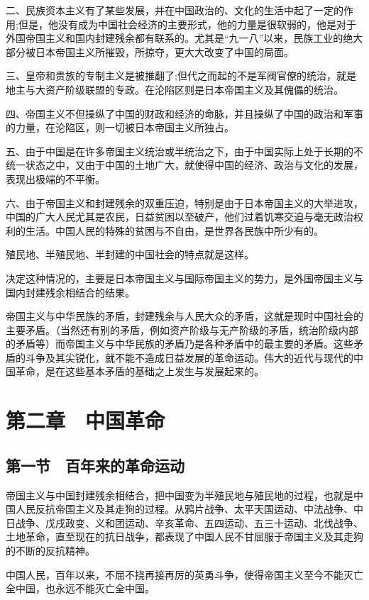二、民族资本主义有了某些发展，并在中国政治的、文化的生活中起了一定的作用;但是，他没有成为中国社会经济的主要形式，他的力量是很软弱的，他是对于外国帝国主义和国内封建残余都有联系的。尤其是“九一八”以来，民族工业的绝大部分被日本帝国主义所摧毁，所掠夺，更大大改变了中国的局面。

三、皇帝和贵族的专制主义是被推翻了;但代之而起的不是军阀官僚的统治，就是地主与大资产阶级联盟的专政。在沦陷区则是日本帝国主义及其傀儡的统治。

四、帝国主义不但操纵了中国的财政和经济的命脉，并且操纵了中国的政治和军事的力量，在沦陷区，则一切被日本帝国主义所独占。

五、由于中国是在许多帝国主义统治或半统治之下，由于中国实际上处于长期的不统一状态之中，又由于中国的土地广大，就使得中国的经济、政治与文化的发展，表现出极端的不平衡。

六、由于帝国主义和封建残余的双重压迫，特别是由于日本帝国主义的大举进攻，中国的广大人民尤其是农民，日益贫困以至破产，他们过着饥寒交迫与毫无政治权利的生活。中国人民的特殊的贫困与不自由，是世界各民族中所少有的。

殖民地、半殖民地、半封建的中国社会的特点就是这样。

决定这种情况的，主要是日本帝国主义与国际帝国主义的势力，是外国帝国主义与国内封建残余相结合的结果。

帝国主义与中华民族的矛盾，封建残余与人民大众的矛盾，这就是现时中国社会的主要矛盾。（当然还有别的矛盾，例如资产阶级与无产阶级的矛盾，统治阶级内部的矛盾等）而帝国主义与中华民族的矛盾乃是各种矛盾中的最主要的矛盾。这些矛盾的斗争及其尖锐化，就不能不造成日益发展的革命运动。伟大的近代与现代的中国革命，是在这些基本矛盾的基础之上发生与发展起来的。

\section{第二章　中国革命}

\subsection{第一节　百年来的革命运动}

帝国主义与中国封建残余相结合，把中国变为半殖民地与殖民地的过程，也就是中国人民反抗帝国主义及其走狗的过程。从鸦片战争、太平天国运动、中法战争、中日战争、戊戌政变、义和团运动、辛亥革命、五四运动、五三十运动、北伐战争、土地革命，直至现在的抗日战争，都表现了中国人民不甘屈服于帝国主义及其走狗的不断的反抗精神。

中国人民，百年以来，不屈不挠再接再厉的英勇斗争，使得帝国主义至今不能灭亡全中国，也永远不能灭亡全中国。

